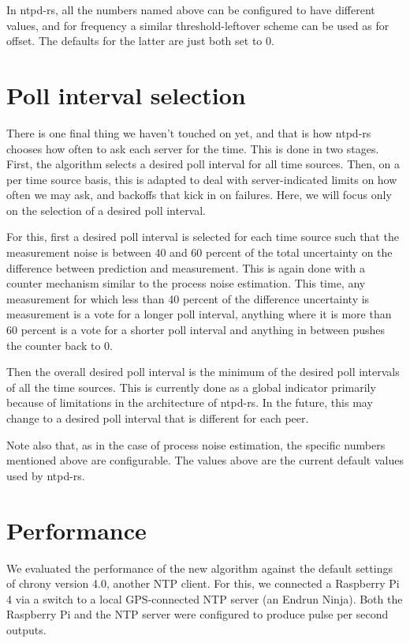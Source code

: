 \documentclass{article}
\begin{document}
In ntpd-rs, all the numbers named above can be configured to have different values, and for frequency a similar threshold-leftover scheme can be used as for offset.
The defaults for the latter are just both set to 0.

\section{Poll interval selection}

There is one final thing we haven't touched on yet, and that is how ntpd-rs chooses how often to ask each server for the time. This is done in two stages. First, the algorithm selects a desired poll interval for all time sources. Then, on a per time source basis, this is adapted to deal with server-indicated limits on how often we may ask, and backoffs that kick in on failures. Here, we will focus only on the selection of a desired poll interval.

For this, first a desired poll interval is selected for each time source such that the measurement noise is between 40 and 60 percent of the total uncertainty on the difference between prediction and measurement. This is again done with a counter mechanism similar to the process noise estimation. This time, any measurement for which less than 40 percent of the difference uncertainty is measurement is a vote for a longer poll interval, anything where it is more than 60 percent is a vote for a shorter poll interval and anything in between pushes the counter back to 0.

Then the overall desired poll interval is the minimum of the desired poll intervals of all the time sources. This is currently done as a global indicator primarily because of limitations in the architecture of ntpd-rs. In the future, this may change to a desired poll interval that is different for each peer.

Note also that, as in the case of process noise estimation, the specific numbers mentioned above are configurable. The values above are the current default values used by ntpd-rs.

\section{Performance}

We evaluated the performance of the new algorithm against the default settings of chrony version 4.0, another NTP client. For this, we connected a Raspberry Pi 4 via a switch to a local GPS-connected NTP server (an Endrun Ninja). Both the Raspberry Pi and the NTP server were configured to produce pulse per second outputs.
\end{document}
